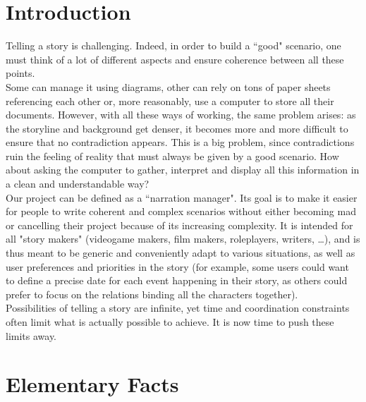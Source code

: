 \documentclass[a4paper ,12pt,french]{article}
\begin{document}

\thispagestyle{fancy}

\pagebreak
\setcounter{page}{1}
\pagestyle{fancy} %
\section{Introduction}

Telling a story is challenging. Indeed, in order to build a ``good" scenario, one must think of a lot of different aspects and ensure coherence between all these points. \\

Some can manage it using diagrams, other can rely on tons of paper sheets referencing each other or, more reasonably, use a computer to store all their documents. However, with all these ways of working, the same problem arises: as the storyline and background get denser, it becomes more and more difficult to ensure that no contradiction appears. This is a big problem, since contradictions ruin the feeling of reality that must always be given by a good scenario. How about asking the computer to gather, interpret and display all this information in a clean and understandable way?\\

Our project can be defined as a ``narration manager". Its goal is to make it easier for people to write coherent and complex scenarios without either becoming mad or cancelling their project because of its increasing complexity. It is intended for all "story makers" (videogame makers, film makers, roleplayers, writers, \dots), and is thus meant to be generic and conveniently adapt to various situations, as well as user preferences and priorities in the story (for example, some users could want to define a precise date for each event happening in their story, as others could prefer to focus on the relations binding all the characters together).\\

Possibilities of telling a story are infinite, yet time and coordination constraints often limit what is actually possible to achieve. It is now time to push these limits away.
 
\section{Elementary Facts}
\end{document}

